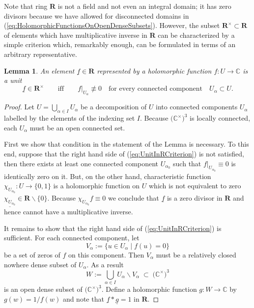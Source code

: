\documentclass{amsart}
\newtheorem{lemma}[theorem]{Lemma}
\begin{document}
Note that ring $\mathbf R$ is not a field and not even an integral domain; it has zero divisors because we have allowed for disconnected domains in (\ref{eq:HolomorphicFunctionsOnOpenDenseSubsets}). However, the subset $\mathbf R^\times\subset\mathbf R$ of elements which have multiplicative inverse in $\mathbf R$ can be characterized by a simple criterion which, remarkably enough, can be formulated in terms of an arbitrary representative.
\begin{lemma}
An element $\underline f\in\mathbf R$ represented by a holomorphic function $f:U\rightarrow\mathbb C$ is a unit 
\begin{equation}
    \underline f\in\mathbf R^\times\qquad\textrm{iff}\qquad f\big|_{U_\alpha}\not\equiv0\quad\textrm{for every connected component}\quad U_\alpha\subset U.
\label{eq:UnitInRCriterion}
\end{equation}
\label{lemm:UnitInRCriterion}
\end{lemma}
\begin{proof}
Let $U=\bigcup_{\alpha\in I}U_{\alpha}$ be a decomposition of $U$ into connected components $U_\alpha$ labelled by the elements of the indexing set $I$. Because $\big(\mathbb C^\times\big)^3$ is locally connected, each $U_\alpha$ must be an open connected set.

First we show that condition in the statement of the Lemma is necessary. To this end, suppose that the right hand side of (\ref{eq:UnitInRCriterion}) is not satisfied, then there exists at least one connected component $U_{\alpha_0}$ such that $f|_{U_{\alpha_0}}\equiv0$ is identically zero on it.
But, on the other hand, characteristic function $\chi_{U_{\alpha_0}}:U\rightarrow\{0,1\}$ is a holomorphic function on $U$ which is not equivalent to zero $\underline{\chi_{U_{\alpha_0}}}\in\mathbf R\backslash\{0\}$.
Because $\chi_{U_{\alpha_0}}f\equiv0$ we conclude that $\underline{f}$ is a zero divisor in $\mathbf R$ and hence cannot have a multiplicative inverse.

It remains to show that the right hand side of (\ref{eq:UnitInRCriterion}) is sufficient. For each connected component, let
\begin{equation*}
V_\alpha:=\{u\in U_\alpha\;|\;f(u)=0\}
\end{equation*}
be a set of zeros of $f$ on this component. Then $V_\alpha$ must be a relatively closed nowhere dense subset of $U_\alpha$. As a result
\begin{equation*}
W:=\bigcup_{\alpha\in I}U_{\alpha}\backslash V_\alpha\;\subset\;\big(\mathbb C^\times\big)^3
\end{equation*}
is an open dense subset of $\big(\mathbb C^\times\big)^3$. Define a holomorphic function $g:W\rightarrow\mathbb C$ by $g(w)=1/f(w)$ and note that $\underline f*\underline g=1$ in $\mathbf R$.
\end{proof}
\end{document}
